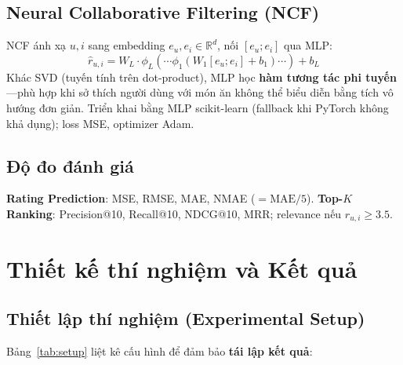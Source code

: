 \documentclass[11pt]{article}
\begin{document}
\subsection{Neural Collaborative Filtering (NCF)}
NCF ánh xạ $u, i$ sang embedding $e_u, e_i \in \mathbb{R}^d$, nối $[e_u; e_i]$ qua MLP:
\begin{equation}
    \hat{r}_{u,i} = W_L \cdot \phi_L(\cdots \phi_1(W_1 [e_u; e_i] + b_1) \cdots) + b_L
\end{equation}
Khác SVD (tuyến tính trên dot-product), MLP học \textbf{hàm tương tác phi tuyến}---phù hợp khi sở thích người dùng với món ăn không thể biểu diễn bằng tích vô hướng đơn giản. Triển khai bằng MLP scikit-learn (fallback khi PyTorch không khả dụng); loss MSE, optimizer Adam.

\subsection{Độ đo đánh giá}
\textbf{Rating Prediction}: MSE, RMSE, MAE, NMAE ($=\text{MAE}/5$). \textbf{Top-$K$ Ranking}: Precision@10, Recall@10, NDCG@10, MRR; relevance nếu $r_{u,i} \geq 3.5$.

\section{Thiết kế thí nghiệm và Kết quả}
\label{sec:exp}

\subsection{Thiết lập thí nghiệm (Experimental Setup)}
Bảng~\ref{tab:setup} liệt kê cấu hình để đảm bảo \textbf{tái lập kết quả}:
\end{document}
